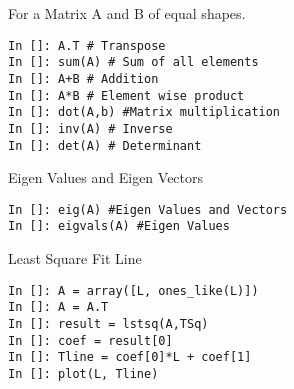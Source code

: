 \documentclass[12pt]{article}
\begin{document}
For a Matrix A and B of equal shapes.
\begin{lstlisting}
In []: A.T # Transpose
In []: sum(A) # Sum of all elements
In []: A+B # Addition
In []: A*B # Element wise product
In []: dot(A,b) #Matrix multiplication
In []: inv(A) # Inverse
In []: det(A) # Determinant
\end{lstlisting}

Eigen Values and Eigen Vectors
\begin{lstlisting}
In []: eig(A) #Eigen Values and Vectors
In []: eigvals(A) #Eigen Values 
\end{lstlisting}
Least Square Fit Line
\begin{lstlisting}
In []: A = array([L, ones_like(L)])
In []: A = A.T
In []: result = lstsq(A,TSq)
In []: coef = result[0]
In []: Tline = coef[0]*L + coef[1]
In []: plot(L, Tline)
\end{lstlisting}
\end{document}
